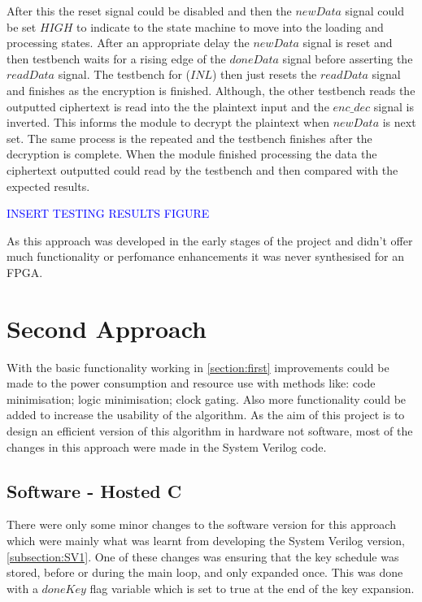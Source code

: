 \documentclass[12pt,twoside,a4paper]{report}
\begin{document}
	After this the reset signal could be disabled and then the $newData$ signal could be set $HIGH$ to indicate to the state machine to move into the loading and processing states. After an appropriate delay the $newData$ signal is reset and then testbench waits for a rising edge of the $doneData$ signal before asserting the $readData$ signal. The testbench for ($INL$) then just resets the $readData$ signal and finishes as the encryption is finished. Although, the other testbench reads the outputted ciphertext is read into the the plaintext input and the $enc\_dec$ signal is inverted. This informs the module to decrypt the plaintext when $newData$ is next set. The same process is the repeated and the testbench finishes after the decryption is complete. When the module finished processing the data the ciphertext outputted could read by the testbench and then compared with the expected results.
	
	\textcolor{blue}{INSERT TESTING RESULTS FIGURE}
	
	As this approach was developed in the early stages of the project and didn't offer much functionality or perfomance enhancements it was never synthesised for an FPGA.
    
	\section{Second Approach}
	\label{section:second}
	With the basic functionality working in \autoref{section:first} improvements could be made to the power consumption and resource use with methods like: code minimisation; logic minimisation; clock gating. Also more functionality could be added to increase the usability of the algorithm. As the aim of this project is to design an efficient version of this algorithm in hardware not software, most of the changes in this approach were made in the System Verilog code.
    
	\subsection{Software - Hosted C}
	\label{subsection:HOSTED2}
	
	There were only some minor changes to the software version for this approach which were mainly what was learnt from developing the System Verilog version, \autoref{subsection:SV1}. One of these changes was ensuring that the key schedule was stored, before or during the main loop, and only expanded once. This was done with a $doneKey$ flag variable which is set to true at the end of the key expansion. 
    
\end{document}
